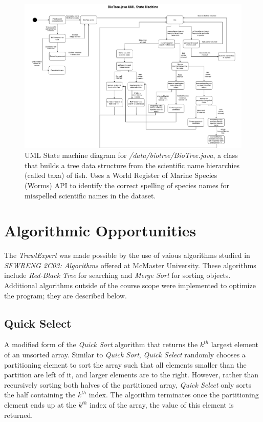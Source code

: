 \documentclass{article}
\begin{document}
\begin{figure}[H]
\centering
\includegraphics[width=18cm, trim={0 0 0 0}, clip]{BioTreeDotJava.pdf}

\caption{UML State machine diagram for \textit{/data/biotree/BioTree.java}, a class that builds a tree data structure from the scientific name hierarchies (called taxa) of fish. Uses a World Register of Marine Species (Worms) API to identify the correct spelling of species names for misspelled scientific names in the dataset. }
\label{fig:BioTreeUML}
\end{figure}


\section{Algorithmic Opportunities}
The \textit{TrawlExpert} was made possible by the use of vaious algorithms studied in \textit{SFWRENG 2C03: Algorithms} offered at McMaster University. These algorithms include \textit{Red-Black Tree} for searching and \textit{Merge Sort} for sorting objects. Additional algorithms outside of the course scope were implemented to optimize the program; they are described below. 

\subsection{Quick Select}
A modified form of the \textit{Quick Sort} algorithm that returns the $k^{th}$ largest element of an unsorted array. Similar to \textit{Quick Sort}, \textit{Quick Select} randomly chooses a partitioning element to sort the array such that all elements smaller than the partition are left of it, and larger elements are to the right. However, rather than recursively sorting both halves of the partitioned array, \textit{Quick Select} only sorts the half containing the $k^{th}$ index. The algorithm terminates once the partitioning element ends up at the $k^{th}$ index of the array, the value of this element is returned.
\end{document}
